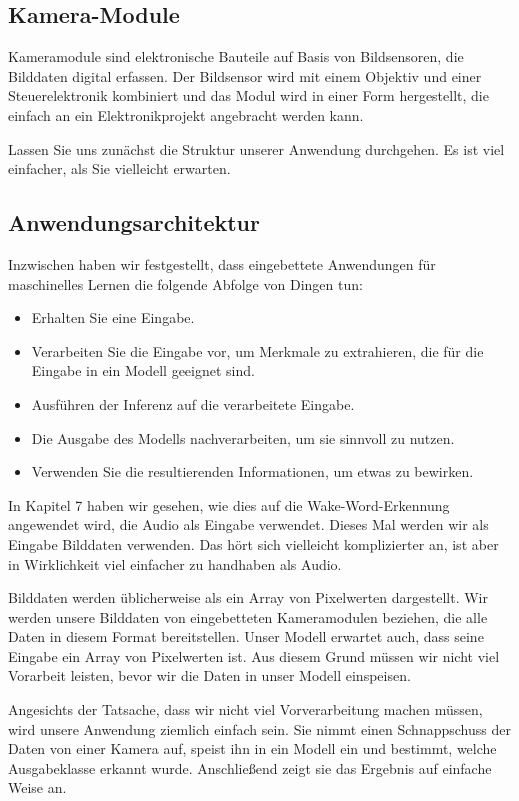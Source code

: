 \subsection{Kamera-Module}

Kameramodule sind elektronische Bauteile auf Basis von Bildsensoren, die Bilddaten digital erfassen. Der Bildsensor wird mit einem Objektiv und einer Steuerelektronik kombiniert und das Modul wird in einer Form hergestellt, die einfach an ein Elektronikprojekt angebracht werden kann.

Lassen Sie uns zunächst die Struktur unserer Anwendung durchgehen. Es ist viel einfacher, als Sie vielleicht erwarten.


\subsection{Anwendungsarchitektur}

Inzwischen haben wir festgestellt, dass eingebettete Anwendungen für maschinelles Lernen die folgende Abfolge von Dingen tun:

\begin{itemize}
  \item Erhalten Sie eine Eingabe.
  \item Verarbeiten Sie die Eingabe vor, um Merkmale zu extrahieren, die für die Eingabe in ein Modell geeignet sind.
  \item Ausführen der Inferenz auf die verarbeitete Eingabe.
  \item Die Ausgabe des Modells nachverarbeiten, um sie sinnvoll zu nutzen.
  \item Verwenden Sie die resultierenden Informationen, um etwas zu bewirken.
\end{itemize}

In Kapitel 7 haben wir gesehen, wie dies auf die Wake-Word-Erkennung angewendet wird, die Audio als Eingabe verwendet. Dieses Mal werden wir als Eingabe Bilddaten verwenden. Das hört sich vielleicht komplizierter an, ist aber in Wirklichkeit viel einfacher zu handhaben als Audio.

Bilddaten werden üblicherweise als ein Array von Pixelwerten dargestellt. Wir werden unsere Bilddaten von eingebetteten Kameramodulen beziehen, die alle Daten in diesem Format bereitstellen. Unser Modell erwartet auch, dass seine Eingabe ein Array von Pixelwerten ist. Aus diesem Grund müssen wir nicht viel Vorarbeit leisten, bevor wir die Daten in unser Modell einspeisen.

Angesichts der Tatsache, dass wir nicht viel Vorverarbeitung machen müssen, wird unsere Anwendung ziemlich einfach sein. Sie nimmt einen Schnappschuss der Daten von einer Kamera auf, speist ihn in ein Modell ein und bestimmt, welche Ausgabeklasse erkannt wurde. Anschließend zeigt sie das Ergebnis auf einfache Weise an.

